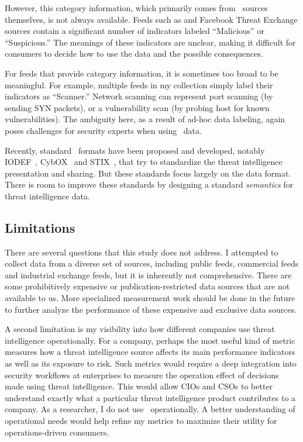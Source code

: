 However, this category information, which primarily comes from \ti\ sources
themselves, is not always available. Feeds such as {\feedalienvault} and
Facebook Threat Exchange sources contain a significant number
of indicators labeled ``Malicious'' or ``Suspicious.'' The meanings of
these indicators are unclear, making it difficult for consumers to decide
how to use the data and the possible consequences.

For feeds that provide category information, it is sometimes too broad
to be meaningful. For example, multiple feeds in my collection
simply label their indicators as ``Scanner.'' Network scanning can
represent port scanning (by sending SYN packets), or a vulnerability scan (by
probing host for known vulnerabilities). The ambiguity here, as a result of
ad-hoc data labeling, again poses challenges for security experts when using
\ti\ data.

Recently, standard \ti\ formats have been proposed and developed, notably
IODEF~\cite{IODEF}, CybOX~\cite{CybOX} and STIX~\cite{STIX}, that try to
standardize the threat intelligence presentation and sharing. But these
standards focus largely on the data format. There is room
to improve these standards by designing a standard \emph{semantics} for threat
intelligence data.

\subsection{Limitations}
There are several questions that this study does not address. I attempted to collect data from a diverse set of
sources, including public feeds, commercial feeds and industrial exchange feeds,
but it is inherently not comprehensive. There are some prohibitively expensive or
publication-restricted data sources that are not available to us. More specialized measurement
work should be done in the future to further analyze the performance of these
expensive and exclusive data sources.

A second limitation is my visibility into how different companies use threat
intelligence operationally. For a company, perhaps the most useful kind of metric
measures how a threat intelligence source affects its main performance indicators
as well as its exposure to risk. Such metrics would require a deep integration
into security workflows at enterprises to measure the operation effect of decisions
made using threat intelligence. This would allow CIOs and CSOs to better understand
exactly what a particular threat intelligence product contributes to a company. As a
researcher, I do not use \ti\ operationally. A better understanding of operational
needs would help refine my metrics to maximize their utility for operations-driven consumers.

